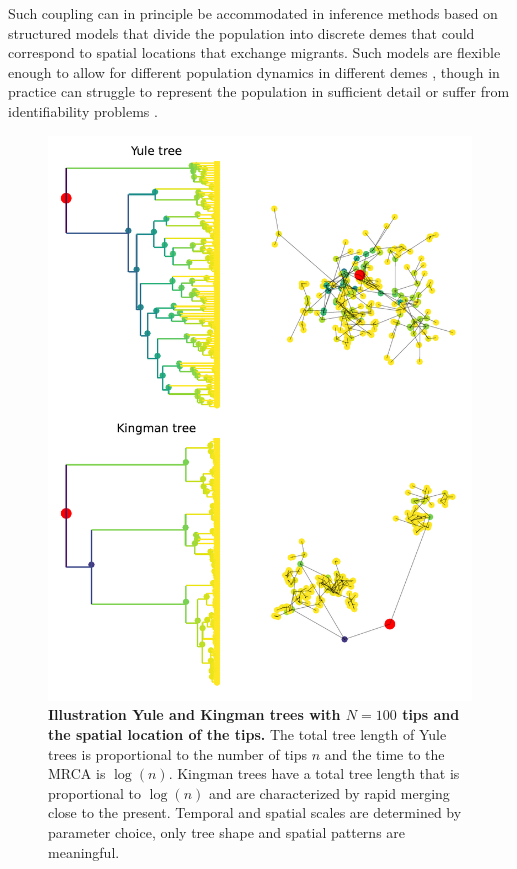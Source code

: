 \documentclass[aps,rmp, twocolumn]{revtex4}
\begin{document}
Such coupling can in principle be accommodated in inference methods based on structured models that divide the population into discrete demes that could correspond to spatial locations that exchange migrants.
Such models are flexible enough to allow for different population dynamics in different demes \citep{vaughan_efficient_2014}, though in practice can struggle to represent the population in sufficient detail or suffer from identifiability problems \citep{layan_impact_2023}.


\begin{figure}[tb]
    \includegraphics*[width=\columnwidth]{figures/Fig1}
    \caption{\label{fig:illustration_tree}{\bf Illustration Yule and Kingman trees with $N=100$ tips and the spatial location of the tips.}
    The total tree length of Yule trees is proportional to the number of tips $n$ and the time to the MRCA is $\log(n)$.
    Kingman trees have a total tree length that is proportional to $\log(n)$ and are characterized by rapid merging close to the present.
    Temporal and spatial scales are determined by parameter choice, only tree shape and spatial patterns are meaningful. }
\end{figure}
\end{document}
